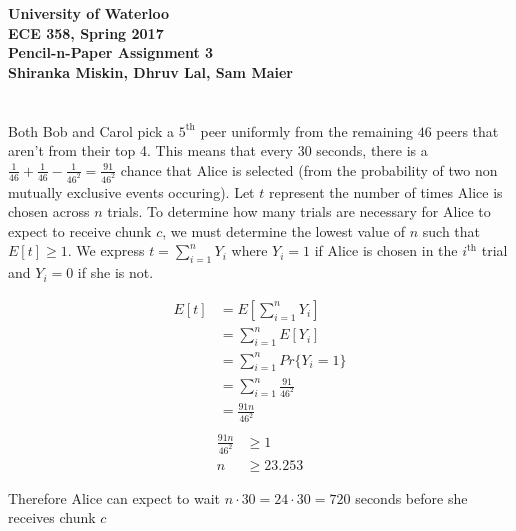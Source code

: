 \documentclass[12pt]{article}
\newcommand{\class}{ECE 358}
\newcommand{\subtitle}{Pencil-n-Paper Assignment 3}
\begin{document}
\begin{center}
{\Large\bf University of Waterloo}\\
\vspace{3mm}
{\Large\bf \class, Spring 2017}\\
\vspace{2mm}
{\Large\bf \subtitle}\\
\vspace{3mm}
\textbf{Shiranka Miskin, Dhruv Lal, Sam Maier}
\end{center}

\section{}

Both Bob and Carol pick a $5^{\text{th}}$ peer uniformly from the remaining $46$
peers that aren't from their top 4.  This means that every 30 seconds, there is
a $\frac{1}{46} + \frac{1}{46} - \frac{1}{46^2} = \frac{91}{46^2}$ chance that Alice is selected
(from the probability of two non mutually exclusive events occuring).  Let $t$
represent the number of times Alice is chosen across $n$ trials.  To determine
how many trials are necessary for Alice to expect to receive chunk $c$, we must
determine the lowest value of $n$ such that $E[t] \geq 1$.  We express $t =
\sum_{i = 1}^nY_i$ where $Y_i = 1$ if Alice is chosen in the $i^{\text{th}}$
trial and $Y_i = 0$ if she is not.

$$\begin{aligned}
E[t] &= E\left[\sum_{i = 1}^nY_i\right]\\
     &= \sum_{i = 1}^nE[Y_i]\\
     &= \sum_{i = 1}^nPr\{Y_i = 1\}\\
     &= \sum_{i = 1}^n\frac{91}{46^2}\\
     &= \frac{91n}{46^2}\\
\end{aligned}$$
$$\begin{aligned}
   \frac{91n}{46^2} &\geq 1\\
   n &\geq 23.253
\end{aligned}$$

Therefore Alice can expect to wait $n \cdot 30 = 24 \cdot 30 = 720$ seconds
before she receives chunk $c$

\section{}
\end{document}
